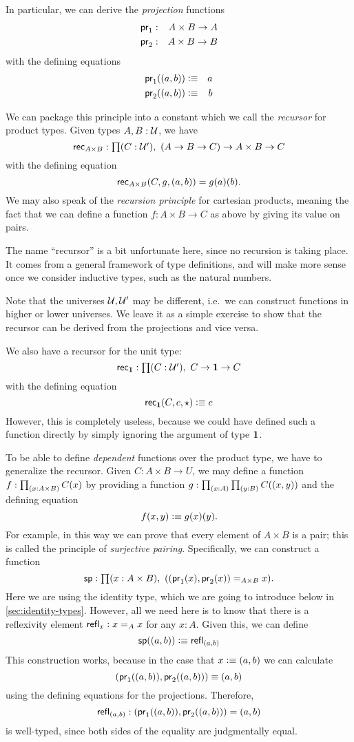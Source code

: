 In particular, we can derive the \emph{projection} functions
\begin{eqnarray*}
  \mathsf{pr}_{1} & : & A \times B \to A \\
  \mathsf{pr}_{2} & : & A \times B \to B
\end{eqnarray*}
with the defining equations 
\begin{eqnarray*}
  \mathsf{pr}_{1}(( a,b)) & \vcentcolon\equiv & a \\
  \mathsf{pr}_{2}(( a,b)) & \vcentcolon\equiv & b
\end{eqnarray*}

We can package this principle into a constant which we call the
\emph{recursor} for product
types.  Given types $A,B : \mathcal{U}$, we have
\[\rec{A\times B} : \prd{C:\UU'}(A \to B \to C) \to A \times B \to C\]
with the defining equation
\[\mathsf{rec}_{A\times B}(C,g,( a,b)) = g(a)(b). \]
We may also speak of the \emph{recursion principle} for cartesian products, meaning the fact that we can define a function $f:A\times B\to C$ as above by giving its value on pairs.

The name ``recursor'' is a bit unfortunate here, since no recursion is taking place.
It comes from a general framework of type definitions, and will make more sense once we consider inductive types, such as
the natural numbers.

Note that the universes $\mathcal{U},\mathcal{U}'$ may be different, i.e.\ we can
construct functions in higher or lower universes. 
We leave it as a simple exercise to show that the recursor can be
derived from the projections and vice versa.

We also have a recursor for the unit type:
\[\rec{\unit} : \prd{C:\UU'}C \to \unit \to C\]
with the defining equation
\[ \mathsf{rec}_{\mathbf{1}}(C,c,\star) \vcentcolon\equiv c \]
However, this is completely useless,
because we could have defined such a function directly
by simply ignoring the argument of type $\mathbf{1}$.

To be able to define \emph{dependent} functions over the product type, we have
to generalize the recursor. Given $C: A \times B \to U$, we may
define a function $f : \prd{x : A \times B} C(x)$ by providing a
function $g : \prd{x:A}\prd{y:B} C(\tup{x}{y})$ and the defining equation
\[ f(x,y) \vcentcolon\equiv g(x)(y). \] 
For example, in this way we can prove that every element of $A\times B$ is a pair; this is called the principle of \emph{surjective pairing}.
Specifically, we can construct a function
\[ \spr : \prd{x:A \times B} (\tup{\fst {(x)}}{\snd {(x)}} =_{A\times B} x). \]
Here we are using the identity type, which we are going to introduce below in \autoref{sec:identity-types}.
However, all we need here is to know that there is a reflexivity element $\mathsf{refl}_{x} : x =_A x$ for any $x:A$.
Given this, we can define
\[ \mathsf{sp}(( a,b)) \vcentcolon\equiv \mathsf{refl}_{( a,b)} \]
This construction works, because in the case that $x \vcentcolon\equiv ( a,b)$ we can 
calculate 
\[ ( \mathsf{pr}_{1}(( a,b)),\mathsf{pr}_{2}{(( a,b))}) \equiv ( a,b) \]
using the defining equations for the projections. Therefore,
\[ \mathsf{refl}_{( a,b)} : ( \mathsf{pr}_{1}(( a,b)),\mathsf{pr}_{2}{(( a,b))}) = ( a,b) \]
is well-typed, since both sides of the equality are judgmentally equal.

